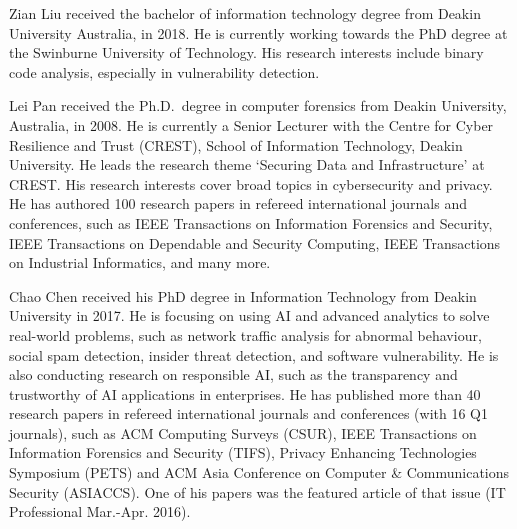 \documentclass[lettersize,journal]{IEEEtran}
\begin{document}




\newpage
\appendix


\begin{IEEEbiography}{Zian Liu}
received the bachelor of information
technology degree from Deakin University Australia,
in 2018. He is currently working towards the PhD
degree at the Swinburne University of Technology.
His research interests include binary code analysis,
especially in vulnerability detection.
\end{IEEEbiography}

\begin{IEEEbiography}
{Lei Pan}
received the Ph.D.~degree in computer forensics from Deakin University, Australia, in 2008. He is currently a Senior Lecturer with the Centre for Cyber Resilience and Trust (CREST), School of Information Technology, Deakin University. He leads the research theme `Securing Data and Infrastructure' at CREST. His research interests cover broad topics in cybersecurity and privacy. He has authored 100 research papers in refereed international journals and conferences, such as IEEE Transactions on Information Forensics and Security, IEEE Transactions on Dependable and Security Computing, IEEE Transactions on Industrial Informatics, and many more.
\end{IEEEbiography}



\begin{IEEEbiography}
{Chao Chen} received his PhD degree in Information Technology from Deakin University in 2017. He is focusing on using AI and advanced analytics to solve real-world problems, such as network traffic analysis for abnormal behaviour, social spam detection, insider threat detection, and software vulnerability. He is also conducting research on responsible AI, such as the transparency and trustworthy of AI applications in enterprises. He has published more than 40 research papers in refereed international journals and conferences (with 16 Q1 journals), such as ACM Computing Surveys (CSUR), IEEE Transactions on Information Forensics and Security (TIFS), Privacy Enhancing Technologies Symposium (PETS) and ACM Asia Conference on Computer \& Communications Security (ASIACCS). One of his papers was the featured article of that issue (IT Professional Mar.-Apr. 2016).
\end{IEEEbiography}
\end{document}
